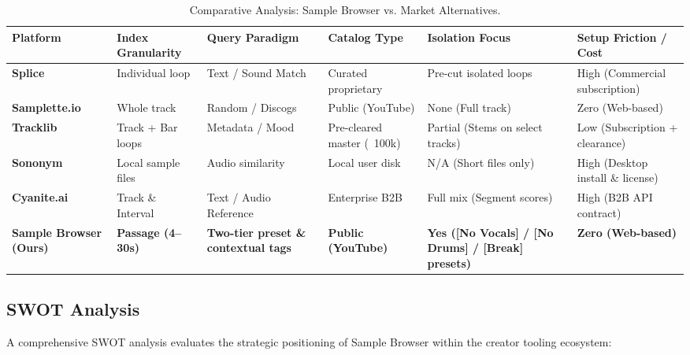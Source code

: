 \begin{table}[h]
    \centering
    \small
    \setlength{\tabcolsep}{3pt}
    \caption{Comparative Analysis: Sample Browser vs. Market Alternatives.}
    \begin{tabularx}{\textwidth}{|>{\raggedright\arraybackslash}p{2.3cm}|>{\raggedright\arraybackslash}X|>{\raggedright\arraybackslash}X|>{\raggedright\arraybackslash}X|>{\raggedright\arraybackslash}X|>{\raggedright\arraybackslash}X|}
        \hline
        \textbf{Platform} & \textbf{Index Granularity} & \textbf{Query Paradigm} & \textbf{Catalog Type} & \textbf{Isolation Focus} & \textbf{Setup Friction / Cost} \\
        \hline
        \textbf{Splice} & Individual loop & Text / Sound Match & Curated proprietary & Pre-cut isolated loops & High (Commercial subscription) \\
        \hline
        \textbf{Samplette.io} & Whole track & Random / Discogs & Public (YouTube) & None (Full track) & Zero (Web-based) \\
        \hline
        \textbf{Tracklib} & Track + Bar loops & Metadata / Mood & Pre-cleared master (~100k) & Partial (Stems on select tracks) & Low (Subscription + clearance) \\
        \hline
        \textbf{Sononym} & Local sample files & Audio similarity & Local user disk & N/A (Short files only) & High (Desktop install \& license) \\
        \hline
        \textbf{Cyanite.ai} & Track \& Interval & Text / Audio Reference & Enterprise B2B & Full mix (Segment scores) & High (B2B API contract) \\
        \hline
        \textbf{Sample Browser (Ours)} & \textbf{Passage (4--30s)} & \textbf{Two-tier preset \& contextual tags} & \textbf{Public (YouTube)} & \textbf{Yes ([No Vocals] / [No Drums] / [Break] presets)} & \textbf{Zero (Web-based)} \\
        \hline
    \end{tabularx}
    \label{tbl:comparative}
\end{table}

\subsection*{SWOT Analysis}

A comprehensive SWOT analysis evaluates the strategic positioning of Sample Browser within the creator tooling ecosystem:

